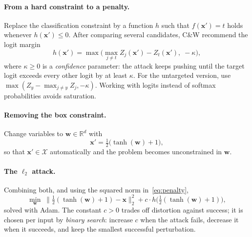 \documentclass[10pt,a4paper]{extarticle}
\theoremstyle{definition}
\newcommand{\R}{\mathbb{R}}
\newcommand{\X}{\mathcal{X}}
\newcommand{\x}{\mathbf{x}}
\newcommand{\xadv}{\mathbf{x}'}
\begin{document}
\paragraph{From a hard constraint to a penalty.} Replace the classification constraint by a function \(h\) such that \(f(\xadv)=t\) holds whenever \(h(\xadv)\le0\). After comparing several candidates, C\&W recommend the logit margin
\begin{equation}\label{eq:cwloss}
h(\xadv) = \max\Big(\max_{j\neq t} Z_j(\xadv) - Z_t(\xadv),\; -\kappa\Big),
\end{equation}
where \(\kappa\ge0\) is a \emph{confidence} parameter: the attack keeps pushing until the target logit exceeds every other logit by at least \(\kappa\). For the untargeted version, use \(\max(Z_y - \max_{j\neq y}Z_j, -\kappa)\). Working with logits instead of softmax probabilities avoids saturation.

\paragraph{Removing the box constraint.} Change variables to \(\mathbf{w}\in\R^d\) with
\[
\xadv = \tfrac12\big(\tanh(\mathbf{w})+1\big),
\]
so that \(\xadv\in\X\) automatically and the problem becomes unconstrained in \(\mathbf{w}\).

\paragraph{The \(\ell_2\) attack.} Combining both, and using the squared norm in~\eqref{eq:penalty},
\begin{equation}\label{eq:cwl2}
\min_{\mathbf{w}}\; \big\|\tfrac12(\tanh(\mathbf{w})+1)-\x\big\|_2^2 + c\cdot h\big(\tfrac12(\tanh(\mathbf{w})+1)\big),
\end{equation}
solved with Adam. The constant \(c>0\) trades off distortion against success; it is chosen per input by \emph{binary search}: increase \(c\) when the attack fails, decrease it when it succeeds, and keep the smallest successful perturbation.
\end{document}
